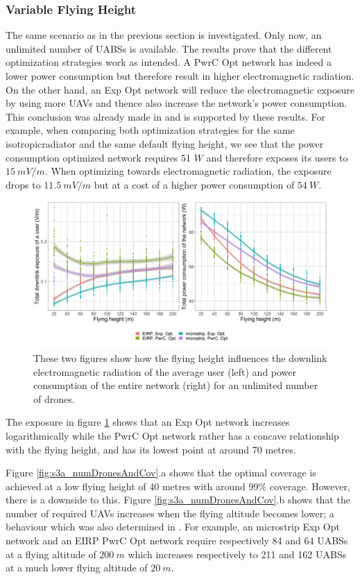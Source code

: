 \documentclass[twocolumn]{phdsymp} %
\begin{document}
\subsubsection{Variable Flying Height}
The same scenario as in the previous section is investigated. Only now, an unlimited number of \gls{UABS}s is available.
The results prove that the different optimization strategies work as intended.
A \gls{PwrC Opt} network has indeed a lower power consumption but therefore result in higher electromagnetic radiation.
On the other hand, an \gls{Exp Opt} network will reduce the electromagnetic exposure by using more \gls{UAV}s and thence also increase the network's
power consumption. This conclusion was already made in \cite{J1} and is supported by these results.
For example, when comparing both optimization strategies for the same \gls{isotropicradiator} and the same default flying height, we see that
the power consumption optimized network requires 51 $W$ and therefore exposes its users
to $15\ mV/m$. When optimizing towards electromagnetic radiation, the exposure drops to $11.5\ mV/m$ but at a cost of a higher power consumption
of $54\ W$.
\begin{figure}[h!]
  \includegraphics[width=\linewidth]{../results/s3/fhvsdlAndPc.png}
  \caption{These two figures show how the flying height influences the downlink electromagnetic radiation of the average user (left) and 
  power consumption of the entire network (right) for an unlimited number of drones.}
  \label{fig:s3a_dlAndPc}
\end{figure}

The exposure in figure \ref{fig:s3a_dlAndPc} shows that an \gls{Exp Opt} network increases logarithmically while the \gls{PwrC Opt} network rather 
has a concave relationship with the flying height, and has its lowest point at around 70 metres.

Figure \ref{fig:s3a_numDronesAndCov}.a shows that the optimal coverage is achieved at a low flying height of 
40 metres with around 99\% coverage. 
However, there is a downside to this. 
Figure \ref{fig:s3a_numDronesAndCov}.b 
 shows that the number of required \gls{UAV}s increases when the flying altitude becomes lower;
a behaviour which was also determined in \cite{J2}.
For example, an microstrip \gls{Exp Opt} network and an \gls{EIRP} \gls{PwrC Opt} network require respectively 84 and 64
\gls{UABS}s at a flying altitude of $200\ m$ which increases respectively to 211 and 162 \gls{UABS}s at a much lower flying altitude of $20\ m$.
\end{document}
